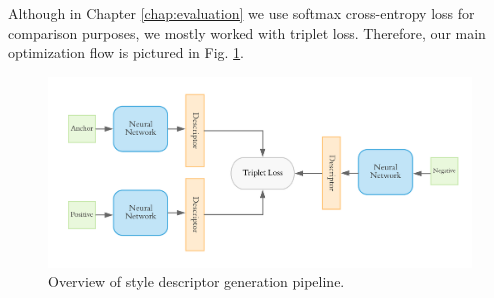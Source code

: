 Although in Chapter \ref{chap:evaluation} we use softmax cross-entropy loss for comparison purposes, we mostly worked with triplet loss.  Therefore, our main optimization flow is pictured in Fig. \ref{fig:triplet_overall}.

\begin{figure}[hbpt]
	\centering
	\includegraphics[width=\linewidth]{imgs/triplet_loss_architecture.pdf}
	\caption{Overview of style descriptor generation pipeline.}
	\label{fig:triplet_overall}
\end{figure}
